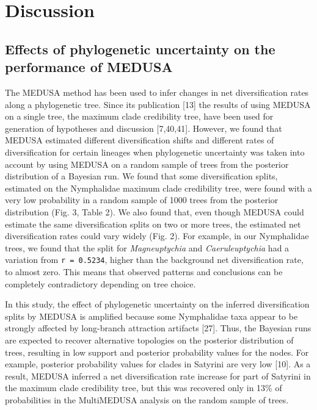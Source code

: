 \documentclass[10pt]{article}
\begin{document}
\section*{Discussion}

\subsection*{Effects of phylogenetic uncertainty on the performance of
MEDUSA}

The MEDUSA method has been used to infer changes in net diversification
rates along a phylogenetic tree. Since its publication {[}13{]} the
results of using MEDUSA on a single tree, the maximum clade credibility
tree, have been used for generation of hypotheses and discussion
{[}7,40,41{]}. However, we found that MEDUSA estimated different
diversification shifts and different rates of diversification for
certain lineages when phylogenetic uncertainty was taken into account by
using MEDUSA on a random sample of trees from the posterior distribution
of a Bayesian run. We found that some diversification splits, estimated
on the Nymphalidae maximum clade credibility tree, were found with a
very low probability in a random sample of 1000 trees from the posterior
distribution (Fig. 3, Table 2). We also found that, even though MEDUSA
could estimate the same diversification splits on two or more trees, the
estimated net diversification rates could vary widely (Fig. 2). For
example, in our Nymphalidae trees, we found that the split for
\emph{Magneuptychia} and \emph{Caeruleuptychia} had a variation from
\texttt{r = 0.5234}, higher than the background net diversification
rate, to almost zero. This means that observed patterns and conclusions
can be completely contradictory depending on tree choice.

In this study, the effect of phylogenetic uncertainty on the inferred
diversification splits by MEDUSA is amplified because some Nymphalidae
taxa appear to be strongly affected by long-branch attraction artifacts
{[}27{]}. Thus, the Bayesian runs are expected to recover alternative
topologies on the posterior distribution of trees, resulting in low
support and posterior probability values for the nodes. For example,
posterior probability values for clades in Satyrini are very low
{[}10{]}. As a result, MEDUSA inferred a net diversification rate
increase for part of Satyrini in the maximum clade credibility tree, but
this was recovered only in 13\% of probabilities in the MultiMEDUSA
analysis on the random sample of trees.
\end{document}
